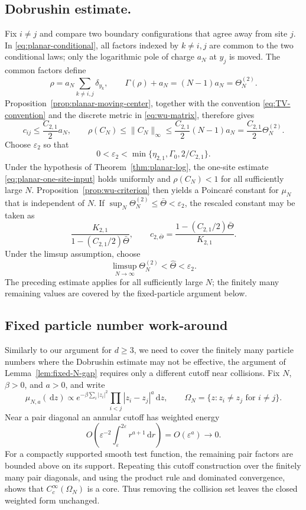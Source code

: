 \documentclass[12pt,reqno,letterpaper]{amsart}
\theoremstyle{definition}
\theoremstyle{remark}
\numberwithin{equation}{section}
\newcommand{\dd}{\,\mathrm d}
\newcommand{\be}{\beta}
\begin{document}
\begin{appendix}
\subsection{Dobrushin estimate.}
Fix \(i\ne j\) and compare two boundary configurations that agree away from
site \(j\).  In \eqref{eq:planar-conditional}, all factors indexed by
\(k\ne i,j\) are common to the two conditional laws; only the logarithmic
pole of charge \(a_N\) at \(y_j\) is moved.  The common factors define
\[
 \rho=a_N\sum_{k\ne i,j}\delta_{y_k},
 \qquad
 \Gamma(\rho)+a_N=(N-1)a_N=\Theta_N^{(2)}.
\]
Proposition~\ref{prop:planar-moving-center}, together with the convention
\eqref{eq:TV-convention} and the discrete metric in
\eqref{eq:wu-matrix}, therefore gives
\begin{equation}\label{eq:planar-dobrushin}
 c_{ij}\le \frac{C_{2,1}}{2}a_N,
 \qquad
 \rho(C_N)\le\|C_N\|_\infty
 \le \frac{C_{2,1}}{2}(N-1)a_N
 =\frac{C_{2,1}}{2}\Theta_N^{(2)}.
\end{equation}
Choose \(\varepsilon_2\) so that
\[
 0<\varepsilon_2<\min\{\eta_{2,1},\Gamma_0,2/C_{2,1}\}.
\]
Under the hypothesis of Theorem~\ref{thm:planar-log}, the one-site estimate
\eqref{eq:planar-one-site-input} holds uniformly and \(\rho(C_N)<1\) for all
sufficiently large \(N\).  Proposition~\ref{prop:wu-criterion} then yields a
Poincar\'e constant for \(\mu_N\) that is independent of \(N\).
If \(\sup_N\Theta_N^{(2)}\le\bar\Theta<\varepsilon_2\), the rescaled
constant may be taken as
\[
 \frac{K_{2,1}}{1-(C_{2,1}/2)\bar\Theta},
 \qquad
 c_{2,\bar\Theta}
 =\frac{1-(C_{2,1}/2)\bar\Theta}{K_{2,1}}.
\]
Under the limsup assumption, choose
\[
 \limsup_{N\to\infty}\Theta_N^{(2)}
 <\widehat\Theta<\varepsilon_2.
\]
The preceding estimate applies for all sufficiently large \(N\); the finitely
many remaining values are covered by the fixed-particle argument below.

\subsection{Fixed particle number work-around}
Similarly to our argument for $d\ge 3$, we need to cover the finitely many particle numbers where the Dobrushin estimate may not be effective,
the argument of Lemma~\ref{lem:fixed-N-gap} requires only a different cutoff near collisions.  Fix \(N\), \(\be>0\), and \(a>0\), and write
\[
 \mu_{N,a}(\dd z)
 \propto e^{-\be\sum_i|z_i|^2}
 \prod_{i<j}|z_i-z_j|^a\dd z,
 \qquad
 \Omega_N=\{z:z_i\ne z_j\text{ for }i\ne j\}.
\]
Near a pair diagonal an annular cutoff has weighted energy
\begin{equation}\label{eq:planar-collision-cutoff}
 O\!\left(\varepsilon^{-2}
 \int_\varepsilon^{2\varepsilon}r^{a+1}\dd r\right)
 =O(\varepsilon^a)\longrightarrow0.
\end{equation}
For a compactly supported smooth test function, the remaining pair factors
are bounded above on its support.  Repeating this cutoff construction over
the finitely many pair diagonals, and using the product rule and dominated
convergence, shows that \(C_c^\infty(\Omega_N)\) is a core.  Thus removing the
collision set leaves the closed weighted form unchanged.


\end{appendix}
\end{document}
